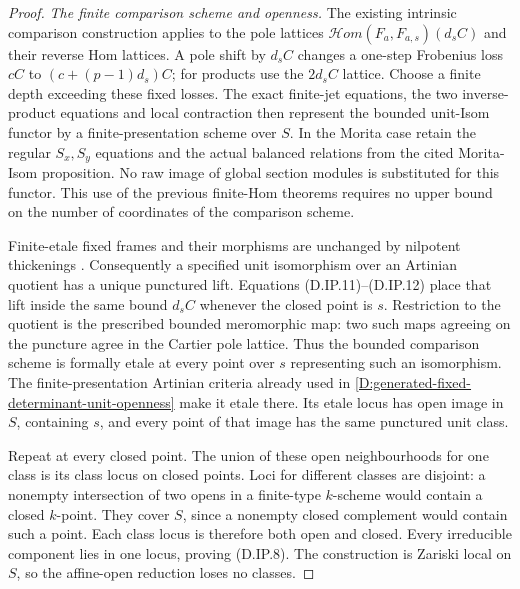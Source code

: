 \begin{proof}
\emph{The finite comparison scheme and openness.}
The existing intrinsic comparison construction applies
to the pole lattices
$\mathcal Hom(F_a,F_{a,s})(d_sC)$ and their reverse
Hom lattices. A pole shift by $d_sC$ changes a
one-step Frobenius loss $cC$ to
$(c+(p-1)d_s)C$; for products use the $2d_sC$ lattice.
Choose a finite depth exceeding these fixed losses.
The exact finite-jet equations, the two inverse-product
equations and local contraction then represent the
bounded unit-Isom functor by a finite-presentation
scheme over $S$. In the Morita case retain the
regular $S_x,S_y$ equations and the actual balanced
relations from the cited Morita-Isom proposition.
No raw image of global section modules is substituted
for this functor. This use of the previous finite-Hom
theorems requires no upper bound on the number of
coordinates of the comparison scheme.

Finite-etale fixed frames and their morphisms are
unchanged by nilpotent thickenings
\citep[Tag 0BQB, Lemma 58.8.3, complete proof]
{StacksIntrinsicUnitHomD}. Consequently a specified
unit isomorphism over an Artinian quotient has a
unique punctured lift. Equations (D.IP.11)--(D.IP.12)
place that lift inside the same bound $d_s C$ whenever
the closed point is $s$. Restriction to the quotient
is the prescribed bounded meromorphic map: two such
maps agreeing on the puncture agree in the Cartier
pole lattice. Thus the bounded comparison scheme is
formally etale at every point over $s$ representing
such an isomorphism. The finite-presentation Artinian
criteria already used in
\ref{D:generated-fixed-determinant-unit-openness}
make it etale there. Its etale locus has open image
in $S$, containing $s$, and every point of that
image has the same punctured unit class.

Repeat at every closed point. The union of these
open neighbourhoods for one class is its class
locus on closed points. Loci for different classes
are disjoint: a nonempty intersection of two opens
in a finite-type $k$-scheme would contain a closed
$k$-point. They cover $S$, since a nonempty closed
complement would contain such a point. Each class
locus is therefore both open and closed. Every
irreducible component lies in one locus, proving
(D.IP.8). The construction is Zariski local on $S$,
so the affine-open reduction loses no classes.
\end{proof}

